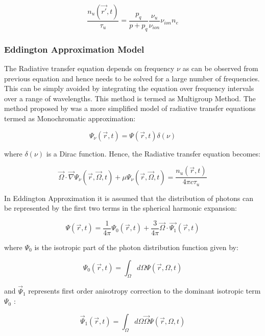 \documentclass{article}
\begin{document}
\begin{equation}
\frac{n_u(\vec{r'},t)}{\tau_u} = \frac{p_q}{p+p_q} \frac{\nu_u}{\nu_{ion}} \nu_{ion} n_e
\end{equation} 


\subsubsection{Eddington Approximation Model}
The Radiative transfer equation depends on frequency $\nu$ as can be observed from previous equation and hence needs to be solved for a large number of frequencies. This can be simply avoided by integrating the equation over frequency intervals over a range of wavelengths. This method is termed as Multigroup Method. The method proposed by \cite{Segur2006} was a more simplified model of radiative transfer equations termed as Monochromatic approximation:

\begin{equation}
\Psi_\nu(\vec{r},t) = \Psi(\vec{r},t) \delta(\nu)
\end{equation} 

where $\delta(\nu)$ is a Dirac function. Hence, the Radiative transfer equation becomes:

\begin{equation} \label{eq:10}
\vec{\Omega} \cdot \vec{\nabla} \Psi_\nu(\vec{r},\vec{\Omega},t) + \mu\Psi_\nu(\vec{r},\vec{\Omega},t) = \frac{n_u (\vec{r},t)}{4 \pi c \tau_{u}}
\end{equation}

In Eddington Approximation it is assumed that the distribution of photons can be represented by the first two terms in the spherical harmonic expansion:

\begin{equation} \label{eq:11}
\Psi(\vec{r},t) = \frac{1}{4\pi}\Psi_0(\vec{r},t) + \frac{3}{4\pi}\vec{\Omega} \cdot \vec{\Psi_1}(\vec{r},t) 
\end{equation} 

where $\Psi_0$ is the isotropic part of the photon distribution function given by:

\begin{equation}
\Psi_0(\vec{r},t) = \int_{\Omega}d\Omega\Psi(\vec{r},\Omega,t) 
\end{equation} 

and $\vec{\Psi}_1$ represents first order anisotropy correction to the dominant isotropic term $\Psi_0$ :

\begin{equation}
\vec{\Psi}_1(\vec{r},t) = \int_{\Omega}d\Omega \vec{\Omega}\Psi(\vec{r},\Omega,t) 
\end{equation} 
\end{document}
